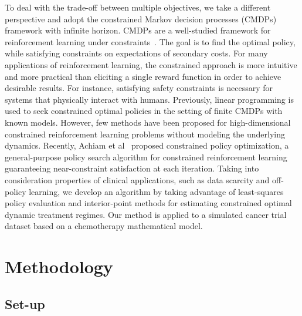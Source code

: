 \documentclass{article}
\begin{document}
To deal with the trade-off between multiple objectives, we take a different perspective and adopt the constrained Markov decision processes (CMDPs) framework with infinite horizon. CMDPs are a well-studied framework for reinforcement learning under constraints~\cite{altman99cmdp}. The goal is to find the optimal policy, while satisfying constraints on expectations of secondary costs. For many applications of reinforcement learning, the constrained approach is more intuitive and more practical than eliciting a single reward function in order to achieve desirable results. For instance, satisfying safety constraints is necessary for systems that physically interact with humans. Previously, linear programming is used to seek constrained optimal policies in the setting of finite CMDPs with known models. However, few methods have been proposed for high-dimensional constrained reinforcement learning problems without modeling the underlying dynamics. Recently, Achiam et al~\cite{Achiam2017} proposed constrained policy optimization, a general-purpose policy search algorithm for constrained reinforcement learning guaranteeing near-constraint satisfaction at each iteration. Taking into consideration properties of clinical applications, such as data scarcity and off-policy learning, we develop an algorithm by taking advantage of least-squares policy evaluation and interior-point methods for estimating constrained optimal dynamic treatment regimes. Our method is applied to a simulated cancer trial dataset based on a chemotherapy mathematical model.\\

\section{Methodology}
\subsection{Set-up}
\end{document}
